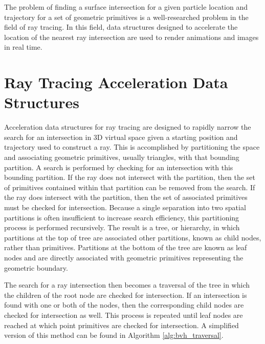 The problem of finding a surface intersection for a given particle location and
trajectory for a set of geometric primitives is a well-researched problem in
the field of ray tracing. In this field, data structures designed to accelerate
the location of the nearest ray intersection are used to render animations and
images in real time.


\section{Ray Tracing Acceleration Data Structures}

Acceleration data structures for ray tracing are designed to rapidly narrow the
search for an intersection in 3D virtual space given a starting position and
trajectory used to construct a ray. This is accomplished by partitioning the
space and associating geometric primitives, usually triangles, with that
bounding partition. A search is performed by checking for an intersection with
this bounding partition. If the ray does not intersect with the partition, then
the set of primitives contained within that partition can be removed from the
search. If the ray does intersect with the partition, then the set of associated
primitives must be checked for intersection. Because a single separation into
two spatial partitions is often insufficient to increase search efficiency, this
partitioning process is performed recursively. The result is a tree, or
hierarchy, in which partitions at the top of tree are associated other
partitions, known as child nodes, rather than primitives. Partitions at the
bottom of the tree are known as leaf nodes and are directly associated with
geometric primitives representing the geometric boundary.

The search for a ray intersection then becomes a traversal of the tree in which
the children of the root node are checked for intersection. If an intersection
is found with one or both of the nodes, then the corresponding child nodes are
checked for intersection as well. This process is repeated until leaf nodes are
reached at which point primitives are checked for intersection. A simplified
version of this method can be found in Algorithm \ref{alg:bvh_traversal}.

